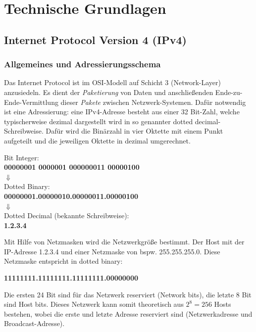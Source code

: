 \chapter{Technische Grundlagen} \label{Technische_Grundlagen}

\section{Internet Protocol Version 4 (IPv4)} \label{ipv4}
\subsection{Allgemeines und Adressierungsschema}
Das Internet Protocol ist im OSI-Modell auf Schicht 3 (Network-Layer) anzusiedeln. Es dient der \textit{Paketierung} von Daten und anschließenden Ende-zu-Ende-Vermittlung dieser \textit{Pakete} zwischen Netzwerk-Systemen. Dafür notwendig ist eine Adressierung: eine IPv4-Adresse besteht aus einer 32 Bit-Zahl, welche typischerweise dezimal dargestellt wird in so genannter \glqq dotted decimal\grqq{}-Schreibweise. Dafür wird die Binärzahl in vier Oktette mit einem Punkt aufgeteilt und die jeweiligen Oktette in dezimal umgerechnet.

{ Bit Integer:\\
\textbf{00000001 0000001 000000011 00000100}\\
$\Downarrow$\\
\glqq Dotted Binary\grqq{}:\\
\textbf{00000001.00000010.00000011.00000100}\\
$\Downarrow$\\
Dotted Decimal (bekannte Schreibweise):\\
{\textbf{1.2.3.4}}\par}

Mit Hilfe von Netzmasken wird die Netzwerkgröße bestimmt. Der Host mit der IP-Adresse 1.2.3.4 und einer Netzmaske von bspw. 255.255.255.0. Diese Netzmaske entspricht in dotted binary:

{\centering\textbf{11111111.11111111.11111111.00000000}\par}

Die ersten 24 Bit sind für das Netzwerk reserviert (Network bits), die letzte 8 Bit sind Host bits. Dieses Netzwerk kann somit theoretisch aus $2^8 = 256$ Hosts bestehen, wobei die erste und letzte Adresse reserviert sind (Netzwerkadresse und Broadcast-Adresse).

